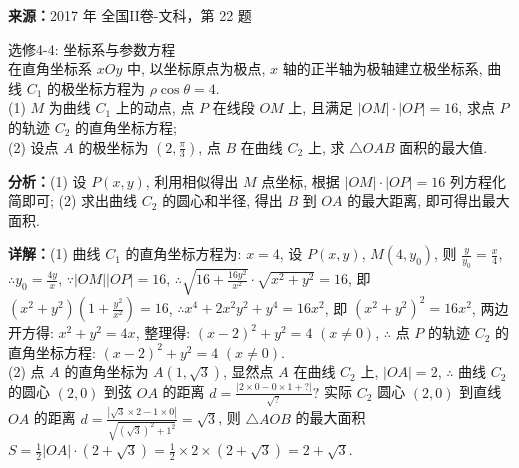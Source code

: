 \begin{question}[points=10]
\textbf{来源：}2017 年 全国II卷-文科，第 22 题\par
选修4-4: 坐标系与参数方程 \\ 在直角坐标系 $xOy$ 中, 以坐标原点为极点, $x$ 轴的正半轴为极轴建立极坐标系, 曲线 $C_1$ 的极坐标方程为 $\rho\cos\theta=4$. \\ (1) $M$ 为曲线 $C_1$ 上的动点, 点 $P$ 在线段 $OM$ 上, 且满足 $|OM|\cdot|OP|=16$, 求点 $P$ 的轨迹 $C_2$ 的直角坐标方程; \\ (2) 设点 $A$ 的极坐标为 $\left(2,\frac{\pi}{3}\right)$, 点 $B$ 在曲线 $C_2$ 上, 求 $\triangle OAB$ 面积的最大值.
\begin{solution}

\textbf{分析：}(1) 设 $P(x,y)$, 利用相似得出 $M$ 点坐标, 根据 $|OM|\cdot|OP|=16$ 列方程化简即可; (2) 求出曲线 $C_2$ 的圆心和半径, 得出 $B$ 到 $OA$ 的最大距离, 即可得出最大面积.

\textbf{详解：}(1) 曲线 $C_1$ 的直角坐标方程为: $x=4$, 设 $P(x,y)$, $M(4,y_0)$, 则 $\frac{y}{y_0}=\frac{x}{4}$, $\therefore y_0=\frac{4y}{x}$, $\because |OM||OP|=16$, $\therefore \sqrt{16+\frac{16y^2}{x^2}}\cdot\sqrt{x^2+y^2}=16$, 即 $(x^2+y^2)\left(1+\frac{y^2}{x^2}\right)=16$, $\therefore x^4+2x^2y^2+y^4=16x^2$, 即 $(x^2+y^2)^2=16x^2$, 两边开方得: $x^2+y^2=4x$, 整理得: $(x-2)^2+y^2=4$ $(x\neq0)$, $\therefore$ 点 $P$ 的轨迹 $C_2$ 的直角坐标方程: $(x-2)^2+y^2=4$ $(x\neq0)$. \\ (2) 点 $A$ 的直角坐标为 $A(1,\sqrt{3})$, 显然点 $A$ 在曲线 $C_2$ 上, $|OA|=2$, $\therefore$ 曲线 $C_2$ 的圆心 $(2,0)$ 到弦 $OA$ 的距离 $d=\frac{|2\times0-0\times1+?|}{\sqrt{?}}?$ 实际 $C_2$ 圆心 $(2,0)$ 到直线 $OA$ 的距离 $d=\frac{|\sqrt{3}\times2-1\times0|}{\sqrt{(\sqrt{3})^2+1^2}}=\sqrt{3}$, 则 $\triangle AOB$ 的最大面积 $S=\frac{1}{2}|OA|\cdot(2+\sqrt{3})=\frac{1}{2}\times2\times(2+\sqrt{3})=2+\sqrt{3}$.
\end{solution}
\end{question}

